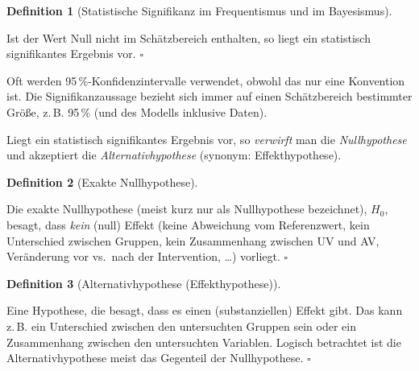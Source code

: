 \documentclass[
  ngerman,
  letterpaper,
  twoside,
  open=any]{scrbook}
\theoremstyle{definition}
\theoremstyle{plain}
\theoremstyle{definition}
\theoremstyle{definition}
\newtheorem{definition}{Definition}[chapter]
\theoremstyle{definition}
\theoremstyle{definition}
\theoremstyle{remark}
\begin{document}
\begin{definition}[Statistische Signifikanz im Frequentismus und im
Bayesismus]\protect\hypertarget{def-signifikanz}{}\label{def-signifikanz}

Ist der Wert Null nicht im Schätzbereich enthalten, so liegt ein
statistisch signifikantes Ergebnis vor. \(\square\)

\end{definition}

Oft werden 95\,\%-Konfidenzintervalle verwendet, obwohl das nur eine
Konvention ist. Die Signifikanzaussage bezieht sich immer auf einen
Schätzbereich bestimmter Größe, z.\,B. 95\,\% (und des Modells inklusive
Daten).

Liegt ein statistisch signifikantes Ergebnis vor, so \emph{verwirft} man
die \emph{Nullhypothese} und akzeptiert die \emph{Alternativhypothese}
(synonym: Effekthypothese).

\begin{definition}[Exakte
Nullhypothese]\protect\hypertarget{def-nullhyp}{}\label{def-nullhyp}

Die exakte Nullhypothese (meist kurz nur als Nullhypothese bezeichnet),
\(H_0\), besagt, dass \emph{kein} (null) Effekt (keine Abweichung vom
Referenzwert, kein Unterschied zwischen Gruppen, kein Zusammenhang
zwischen UV und AV, Veränderung vor vs.~nach der Intervention, \ldots)
vorliegt. \(\square\)

\end{definition}

\begin{definition}[Alternativhypothese
(Effekthypothese)]\protect\hypertarget{def-alternativhyp}{}\label{def-alternativhyp}

Eine Hypothese, die besagt, dass es einen (substanziellen) Effekt gibt.
Das kann z.\,B. ein Unterschied zwischen den untersuchten Gruppen sein
oder ein Zusammenhang zwischen den untersuchten Variablen. Logisch
betrachtet ist die Alternativhypothese meist das Gegenteil der
Nullhypothese. \(\square\)

\end{definition}
\end{document}
